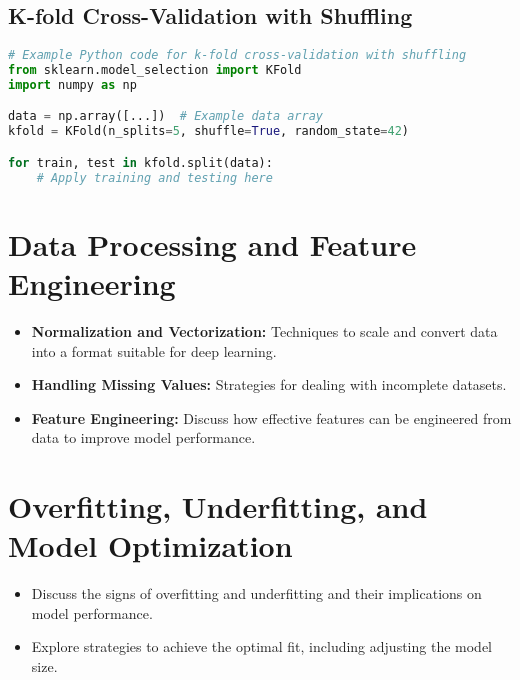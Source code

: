 \subsection{K-fold Cross-Validation with Shuffling}
\begin{lstlisting}[language=Python]
# Example Python code for k-fold cross-validation with shuffling
from sklearn.model_selection import KFold
import numpy as np

data = np.array([...])  # Example data array
kfold = KFold(n_splits=5, shuffle=True, random_state=42)

for train, test in kfold.split(data):
    # Apply training and testing here
\end{lstlisting}


\section{Data Processing and Feature Engineering}
\begin{itemize}
    \item \textbf{Normalization and Vectorization:} Techniques to scale and convert data into a format suitable for deep learning.
    \item \textbf{Handling Missing Values:} Strategies for dealing with incomplete datasets.
    \item \textbf{Feature Engineering:} Discuss how effective features can be engineered from data to improve model performance.
\end{itemize}

\section{Overfitting, Underfitting, and Model Optimization}
\begin{itemize}
    \item Discuss the signs of overfitting and underfitting and their implications on model performance.
    \item Explore strategies to achieve the optimal fit, including adjusting the model size.
\end{itemize}


